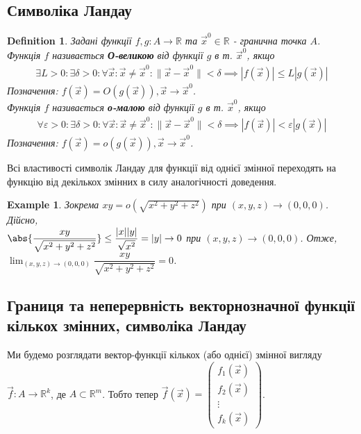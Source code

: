 \documentclass[a4paper, 10pt]{article}
\theoremstyle{theoremdd}
\theoremstyle{theoremdd}
\theoremstyle{theoremdd}
\newtheorem{definition}[theorem]{Definition}
\theoremstyle{theoremdd}
\theoremstyle{theoremdd}
\newtheorem{example}[theorem]{Example}
\theoremstyle{theoremdd}
\theoremstyle{theoremdd}
\theoremstyle{theoremdd}
\theoremstyle{theoremdd}
\newcommand\Norm[1]{\lVert#1\rVert}
\begin{document}
\subsection{Символіка Ландау}
\begin{definition}
Задані функції $f,g: A \to \mathbb{R}$ та $\vec{x}^0 \in \mathbb{R}$ - гранична точка $A$.\\
Функція $f$ називається \textbf{О-великою} від функції $g$ в т. $\vec{x}^0$, якщо
\begin{align*}
\exists L>0: \exists \delta > 0: \forall \vec{x}: \vec{x} \neq \vec{x}^0: \Norm{\vec{x} - \vec{x}^0} < \delta \implies |f(\vec{x})| \leq L |g(\vec{x})|
\end{align*}
Позначення: $f(\vec{x}) = O(g(\vec{x})), \vec{x} \to \vec{x}^0$.\\
Функція $f$ називається \textbf{о-малою} від функції $g$ в т. $\vec{x}^0$, якщо
\begin{align*}
\forall \varepsilon>0: \exists \delta > 0: \forall \vec{x}: \vec{x} \neq \vec{x}^0: \Norm{\vec{x} - \vec{x}^0} < \delta \implies |f(\vec{x})| < \varepsilon |g(\vec{x})|
\end{align*}
Позначення: $f(\vec{x}) = o(g(\vec{x})), \vec{x} \to \vec{x}^0$.
\end{definition}

Всі властивості символік Ландау для функції від однієї змінної переходять на функцію від декількох змінних в силу аналогічності доведення.

\begin{example}
Зокрема $xy = o( \sqrt{x^2+y^2+z^2})$ при $(x,y,z) \to (0,0,0)$. Дійсно,\\
$\abs{\dfrac{xy}{\sqrt{x^2+y^2+z^2}}} \leq \dfrac{|x| |y|}{\sqrt{x^2}} = |y| \to 0$ при $(x,y,z) \to (0,0,0)$. Отже,
$\displaystyle\lim_{(x,y,z) \to (0,0,0)} \dfrac{xy}{\sqrt{x^2+y^2+z^2}} = 0$.
\end{example}

\newpage

\subsection{Границя та неперервність векторнозначної функції кількох змінних, символіка Ландау}
Ми будемо розглядати вектор-функції кількох (або однієї) змінної вигляду $\vec{f}: A \to \mathbb{R}^k$, де $A \subset \mathbb{R}^m$. Тобто тепер $\vec{f}(\vec{x}) = \begin{pmatrix}
f_1(\vec{x}) \\ f_2(\vec{x}) \\ \vdots \\ f_k(\vec{x})
\end{pmatrix}$.
\end{document}
